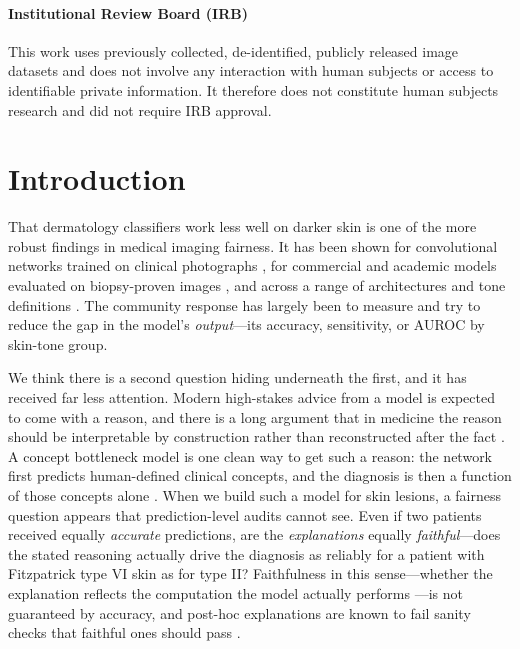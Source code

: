 \documentclass[pmlr,twocolumn,10pt]{jmlr}
\begin{document}
\paragraph*{Institutional Review Board (IRB)}
This work uses previously collected, de-identified, publicly released image
datasets and does not involve any interaction with human subjects or access to
identifiable private information. It therefore does not constitute human
subjects research and did not require IRB approval.
\fi

\section{Introduction}
\label{sec:intro}

That dermatology classifiers work less well on darker skin is one of the more
robust findings in medical imaging fairness. It has been shown for
convolutional networks trained on clinical photographs
\citep{groh2021evaluating}, for commercial and academic models evaluated on
biopsy-proven images \citep{daneshjou2022disparities}, and across a range of
architectures and tone definitions \citep{kinyanjui2020fairness}. The community
response has largely been to measure and try to reduce the gap in the model's
\emph{output}---its accuracy, sensitivity, or AUROC by skin-tone group.

We think there is a second question hiding underneath the first, and it has
received far less attention. Modern high-stakes advice from a model is expected
to come with a reason, and there is a long argument that in medicine the reason
should be interpretable by construction rather than reconstructed after the fact
\citep{rudin2019stop}. A concept bottleneck model is one clean way to get such a
reason: the network first predicts human-defined clinical concepts, and the
diagnosis is then a function of those concepts alone \citep{koh2020concept}.
When we build such a model for skin lesions, a fairness question appears that
prediction-level audits cannot see. Even if two patients received equally
\emph{accurate} predictions, are the \emph{explanations} equally
\emph{faithful}---does the stated reasoning actually drive the diagnosis as
reliably for a patient with Fitzpatrick type VI skin as for type II? Faithfulness
in this sense---whether the explanation reflects the computation the model
actually performs \citep{jacovi2020towards}---is not guaranteed by accuracy, and
post-hoc explanations are known to fail sanity checks that faithful ones should
pass \citep{adebayo2018sanity}.
\end{document}
